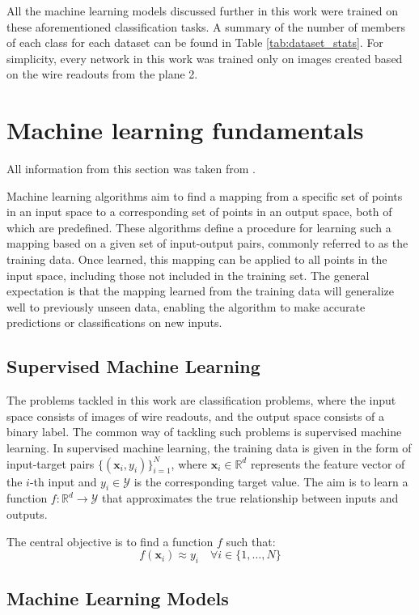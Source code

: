 \documentclass{pracalicmgr}
\begin{document}
All the machine learning models discussed further in this work were trained on these aforementioned classification tasks. A summary of the number of members of each class for each dataset can be found in Table \ref{tab:dataset_stats}. For simplicity, every network in this work was trained only on images created based on the wire readouts from the plane 2.

\chapter{Machine learning fundamentals}

All information from this section was taken from \cite{MlBasics}.

Machine learning algorithms aim to find a mapping from a specific set of points in an input space to a corresponding set of points in an output space, both of which are predefined. These algorithms define a procedure for learning such a mapping based on a given set of input-output pairs, commonly referred to as the training data. Once learned, this mapping can be applied to all points in the input space, including those not included in the training set. The general expectation is that the mapping learned from the training data will generalize well to previously unseen data, enabling the algorithm to make accurate predictions or classifications on new inputs.

\section{Supervised Machine Learning}

The problems tackled in this work are classification problems, where the input space consists of images of wire readouts, and the output space consists of a binary label. The common way of tackling such problems is supervised machine learning.
In supervised machine learning, the training data is given in the form of input-target pairs \( \{(\mathbf{x}_i, y_i)\}_{i=1}^N \), where \( \mathbf{x}_i \in \mathbb{R}^d \) represents the feature vector of the \( i \)-th input and \( y_i \in \mathcal{Y} \) is the corresponding target value. The aim is to learn a function \( f: \mathbb{R}^d \rightarrow \mathcal{Y} \) that approximates the true relationship between inputs and outputs.

The central objective is to find a function \( f \) such that:
\[
f(\mathbf{x}_i) \approx y_i \quad \forall i \in \{1, \dots, N\}
\]

\section{Machine Learning Models}
\end{document}
